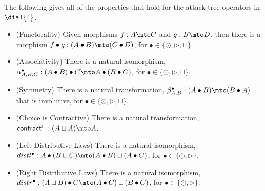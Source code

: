 The following gives all of the properties that hold for the attack
tree operators in $\dial{4}$.
\begin{lemma}
  \label{lemma:properties_of_the_attack_tree_operators_in_dial4}
  \begin{itemize}
  \item[] (Functorality) Given morphisms $f : A \mto C$ and
    $g : B \mto D$, then there is a morphism $f \bullet g : (A \bullet B) \mto (C \bullet D)$, for $\bullet \in \{\odot, \rhd, \sqcup\}$.\\[-5px]
  \item[] (Associativity) There is a natural isomorphism, $\alpha^\bullet_{A,B,C} : (A \bullet B) \bullet C \mto A \bullet (B \bullet C)$, for $\bullet \in \{\odot, \rhd, \sqcup\}$.\\[-5px]
  \item[] (Symmetry) There is a natural transformation, $\beta^\bullet_{A,B} : (A \bullet B) \mto (B \bullet A)$ that is involutive, for $\bullet \in \{\odot, \rhd, \sqcup\}$.\\[-5px]
  \item[] (Choice is Contractive) There is a natural transformation, $\mathsf{contract}^\sqcup : (A \sqcup A) \mto A$.\\[-5px]
  \item[] (Left Distributive Laws) There is a natural isomorphism, $distl^\bullet : A \bullet (B \sqcup C) \mto (A \bullet B) \sqcup (A \bullet C)$, for $\bullet \in \{\odot, \rhd\}$.\\[-5px]
  \item[] (Right Distributive Laws) There is a natural isomorphism, $distr^\bullet : (A \sqcup B) \bullet C \mto (A \bullet C) \sqcup (B \bullet C)$, for $\bullet \in \{\odot, \rhd\}$.
  \end{itemize}
\end{lemma}

